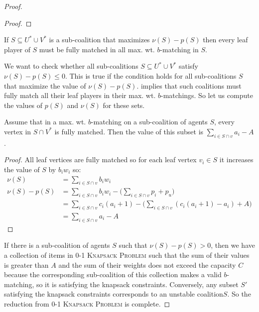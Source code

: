 \begin{proof}
\begin{proof}
\end{proof}
\begin{corollary}
\label{cor:fully_matched}
    If $S\subseteq U^*\cup V^*$ is a sub-coalition that maximizes $\nu(S) - p(S)$ then every leaf player of $S$ must be fully matched in all max. wt. $b$-matching in $S$.
\end{corollary}
 
We want to check whether all sub-coalitions $S \subseteq U^*\cup V^*$ satisfy $\nu(S) - p(S) \leq 0$. This is true if the condition holds for all sub-coalitions $S$ that maximize the value of $\nu(S) - p(S)$.  implies that such coalitions must fully match all their leaf players in their max. wt. $b$-matchings. So let us compute the values of $p(S)$ and $\nu(S)$ for these sets.

\begin{lemma}
    \label{lem:value_in_star}
    Assume that in a max. wt. $b$-matching on a sub-coalition of agents $S$, every vertex in $S \cap V^*$ is fully matched. Then the value of this subset is $\sum_{i \in S\cap v} a_i - A$. 
\end{lemma}

\begin{proof}
All leaf vertices are fully matched so for each leaf vertex $v_i\in S$ it increases the value of $S$ by $b_iw_i$ so:
\begin{align*}
\nu(S) & = \sum_{i \in S \cap v} b_i w_i \\
\nu(S) - p(S) & = \sum_{i \in S \cap v} b_i w_i - \bigg(\sum_{i \in S \cap v} p_i + p_u \bigg) \\
 & = \sum_{i \in S \cap v} c_i (a_i + 1) - \bigg(\sum_{i \in S \cap v} (c_i (a_i + 1) - a_i) + A\bigg) \\
 & = \sum_{i \in S \cap v} a_i - A
\end{align*}
 \end{proof}
If there is a sub-coalition of agents $S$ such that $ \nu(S) - p(S) > 0 $, then we have a collection of items in \textsc{0-1 Knapsack Problem} such that the sum of their values is greater than $A$ and the sum of their weights does not exceed the capacity $C$ because the corresponding sub-coalition of this collection makes a valid $b$-matching, so it is satisfying the knapsack constraints. Conversely, any subset $ S' $ satisfying the knapsack constraints corresponds to an unstable coalition$ S $. So the reduction from \textsc{0-1 Knapsack Problem} is complete.
\end{proof}


